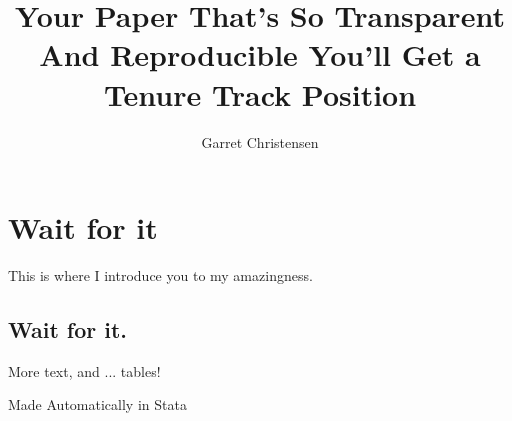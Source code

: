 \documentclass[11pt]{article} %
\title{Your Paper That's So Transparent And Reproducible You'll Get a Tenure Track Position}
\author{Garret Christensen}
\begin{document}
\maketitle

\section{Wait for it}

This is where I introduce you to my amazingness.

\subsection{Wait for it.}

More text, and ... tables!

\begin{table}
\caption{Made Automatically in Stata}

\end{table}


\end{document}
